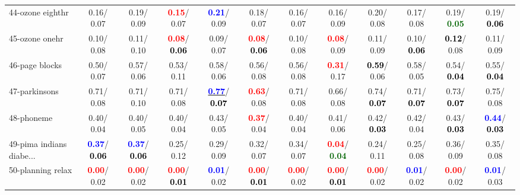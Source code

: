 \begin{table}[h]
\begin{center}
{\begin{tabular}{lc|c|c|c|c|c|c|c|c|c|c}
44-ozone eighthr &   0.16/  0.07 &   0.19/  0.09 & \textcolor{red}{\textbf{  0.15}}/  0.07 & \textcolor{blue}{\textbf{  0.21}}/  0.09 &   0.18/  0.07 &   0.16/  0.07 &   0.16/  0.09 &   0.20/  0.08 &   0.17/  0.08 &   0.19/\textcolor{darkgreen}{\textbf{  0.05}} &   0.19/\textcolor{black}{\textbf{  0.06}} \\
45-ozone onehr &   0.10/  0.08 &   0.11/  0.10 & \textcolor{red}{\textbf{  0.08}}/\textcolor{black}{\textbf{  0.06}} &   0.09/  0.07 & \textcolor{red}{\textbf{  0.08}}/\textcolor{black}{\textbf{  0.06}} &   0.10/  0.08 & \textcolor{red}{\textbf{  0.08}}/  0.09 &   0.11/  0.09 &   0.10/\textcolor{black}{\textbf{  0.06}} & \textcolor{black}{\textbf{  0.12}}/  0.08 &   0.11/  0.09 \\
46-page blocks &   0.50/  0.07 &   0.57/  0.06 &   0.53/  0.11 &   0.58/  0.06 &   0.56/  0.08 &   0.56/  0.08 & \textcolor{red}{\textbf{  0.31}}/  0.17 & \textcolor{black}{\textbf{  0.59}}/  0.06 &   0.58/  0.05 &   0.54/\textcolor{black}{\textbf{  0.04}} &   0.55/\textcolor{black}{\textbf{  0.04}} \\ \hline
47-parkinsons &   0.71/  0.08 &   0.71/  0.10 &   0.71/  0.08 & \underline{\textcolor{blue}{\textbf{  0.77}}}/\textcolor{black}{\textbf{  0.07}} & \textcolor{red}{\textbf{  0.63}}/  0.08 &   0.71/  0.08 &   0.66/  0.08 &   0.74/\textcolor{black}{\textbf{  0.07}} &   0.71/\textcolor{black}{\textbf{  0.07}} &   0.73/\textcolor{black}{\textbf{  0.07}} &   0.75/  0.08 \\
48-phoneme &   0.40/  0.04 &   0.40/  0.05 &   0.40/  0.04 &   0.43/  0.05 & \textcolor{red}{\textbf{  0.37}}/  0.04 &   0.40/  0.04 &   0.41/  0.06 &   0.42/\textcolor{black}{\textbf{  0.03}} &   0.42/  0.04 &   0.43/\textcolor{black}{\textbf{  0.03}} & \textcolor{blue}{\textbf{  0.44}}/\textcolor{black}{\textbf{  0.03}} \\
49-pima indians diabe... & \textcolor{blue}{\textbf{  0.37}}/\textcolor{black}{\textbf{  0.06}} & \textcolor{blue}{\textbf{  0.37}}/\textcolor{black}{\textbf{  0.06}} &   0.25/  0.12 &   0.29/  0.09 &   0.32/  0.07 &   0.34/  0.07 & \textcolor{red}{\textbf{  0.04}}/\textcolor{darkgreen}{\textbf{  0.04}} &   0.24/  0.11 &   0.25/  0.08 &   0.36/  0.09 &   0.35/  0.08 \\
50-planning relax & \textcolor{red}{\textbf{  0.00}}/  0.02 & \textcolor{red}{\textbf{  0.00}}/  0.02 & \textcolor{red}{\textbf{  0.00}}/\textcolor{black}{\textbf{  0.01}} & \textcolor{blue}{\textbf{  0.01}}/  0.02 & \textcolor{red}{\textbf{  0.00}}/\textcolor{black}{\textbf{  0.01}} & \textcolor{red}{\textbf{  0.00}}/  0.02 & \textcolor{red}{\textbf{  0.00}}/\textcolor{black}{\textbf{  0.01}} & \textcolor{red}{\textbf{  0.00}}/  0.02 & \textcolor{blue}{\textbf{  0.01}}/  0.02 & \textcolor{red}{\textbf{  0.00}}/  0.02 & \textcolor{blue}{\textbf{  0.01}}/  0.03 \\

\end{tabular}}
\end{center}
\end{table}
